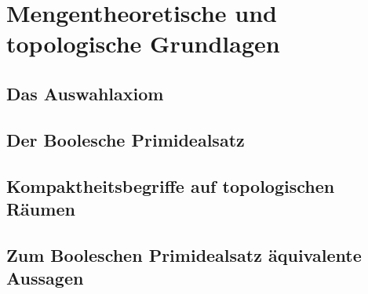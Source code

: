 \section{Mengentheoretische und topologische Grundlagen}

\subsection{Das Auswahlaxiom}

\subsection{Der Boolesche Primidealsatz}

\subsection{Kompaktheitsbegriffe auf topologischen Räumen}
\subsection{Zum Booleschen Primidealsatz äquivalente Aussagen}

